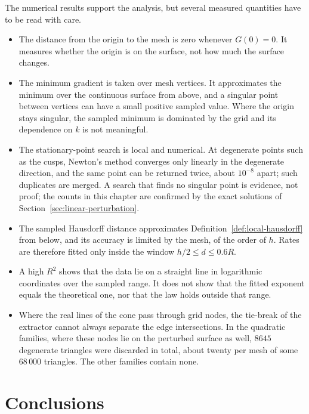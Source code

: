 \documentclass[12pt, a4paper, oneside]{book}
\theoremstyle{plain}
\theoremstyle{definition}
\theoremstyle{remark}
\begin{document}
The numerical results support the analysis, but several measured quantities
have to be read with care.
\begin{itemize}
    \item The distance from the origin to the mesh is zero whenever $G(0)=0$.
          It measures whether the origin is on the surface, not how much the
          surface changes.
    \item The minimum gradient is taken over mesh vertices. It approximates the
          minimum over the continuous surface from above, and a singular point
          between vertices can have a small positive sampled value. Where the
          origin stays singular, the sampled minimum is dominated by the grid
          and its dependence on $k$ is not meaningful.
    \item The stationary-point search is local and numerical. At degenerate
          points such as the cusps, Newton's method converges only linearly in
          the degenerate direction, and the same point can be returned twice,
          about $10^{-8}$ apart; such duplicates are merged. A search that finds
          no singular point is evidence, not proof; the counts in this chapter
          are confirmed by the exact solutions of
          Section~\ref{sec:linear-perturbation}.
    \item The sampled Hausdorff distance approximates
          Definition~\ref{def:local-hausdorff} from below, and its accuracy is
          limited by the mesh, of the order of $h$. Rates are therefore fitted
          only inside the window $h/2\le d\le0.6R$.
    \item A high $R^2$ shows that the data lie on a straight line in logarithmic
          coordinates over the sampled range. It does not show that the
          fitted exponent equals the theoretical one, nor that the law holds
          outside that range.
    \item Where the real lines of the cone pass through grid nodes, the
          tie-break of the extractor cannot always separate the edge
          intersections. In the quadratic families, where these nodes lie on
          the perturbed surface as well, $8645$ degenerate triangles were
          discarded in total, about twenty per mesh of some $68\,000$
          triangles. The other families contain none.
\end{itemize}

\section{Conclusions}
\label{sec:experimental-conclusions}
\end{document}
